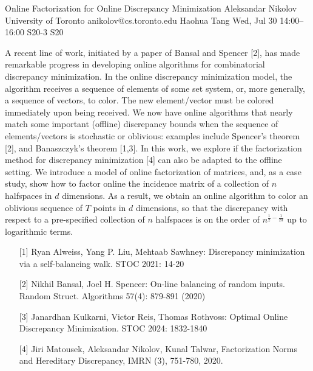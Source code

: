 \begin{talk}
  {Online Factorization for Online Discrepancy Minimization}%
  {Aleksandar Nikolov}%
  {University of Toronto}%
  {anikolov@cs.toronto.edu}%
  {Haohua Tang}%
  {}%
  {Wed, Jul 30 14:00–16:00}%
  {S20-3}%
  {S20}%
  
				
			
A recent line of work, initiated by a paper of Bansal and Spencer [2], has made remarkable progress in developing online algorithms for combinatorial discrepancy minimization. In the online discrepancy minimization model, the algorithm receives a sequence of elements of some set system, or, more generally, a sequence of vectors, to color. The new element/vector must be colored immediately upon being received. We now have online algorithms that nearly match some important (offline) discrepancy bounds when the sequence of elements/vectors is stochastic or oblivious: examples include Spencer's theorem [2], and Banaszczyk's theorem [1,3]. In this work, we explore if the factorization method for discrepancy minimization [4] can also be adapted to the offline setting. We introduce a model of online factorization of matrices, and, as a case study, show how to factor online the incidence matrix of a collection of $n$ halfspaces in $d$ dimensions. As a result, we obtain an online algorithm to color an oblivious sequence of $T$ points in $d$ dimensions, so that the discrepancy with respect to a pre-specified collection of $n$ halfspaces is on the order of $n^{\frac12 - \frac{1}{2d}}$ up to logarithmic terms. 

\medskip

\begin{enumerate}
    \item[{[1]}] Ryan Alweiss, Yang P. Liu, Mehtaab Sawhney:
Discrepancy minimization via a self-balancing walk. STOC 2021: 14-20

	\item[{[2]}] Nikhil Bansal, Joel H. Spencer:
On-line balancing of random inputs. Random Struct. Algorithms 57(4): 879-891 (2020)

    \item[{[3]}] Janardhan Kulkarni, Victor Reis, Thomas Rothvoss:
Optimal Online Discrepancy Minimization. STOC 2024: 1832-1840

    \item[{[4]}] Jiri Matousek, Aleksandar Nikolov, Kunal Talwar, Factorization Norms and Hereditary Discrepancy, IMRN (3), 751-780, 2020. 

\end{enumerate}
\end{talk}

